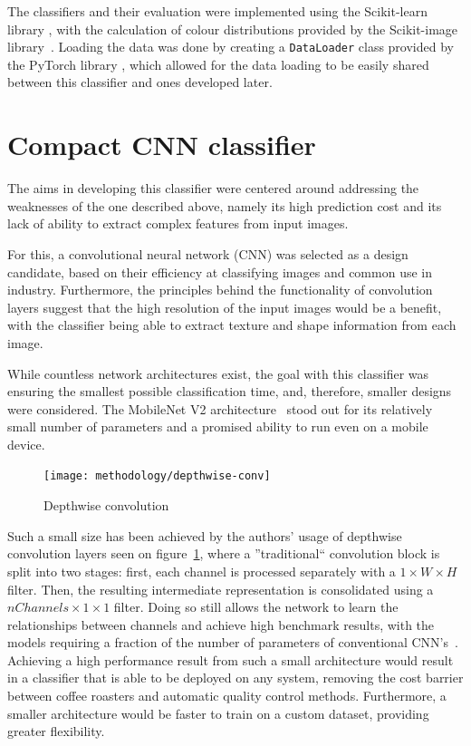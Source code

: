 The classifiers and their evaluation were implemented using the Scikit-learn library \cite{sklearnLibrary}, with the calculation of colour
distributions provided by the Scikit-image library~\cite{skImageLibrary}.
Loading the data was done by creating a \verb|DataLoader| class provided by the PyTorch library \cite{pytorchLibrary}, which allowed
for the data loading to be easily shared between this classifier and ones developed later.
\section{Compact CNN classifier}
\label{sec:deep-learning}
The aims in developing this classifier were centered around addressing the weaknesses of the one described above,
namely its high prediction cost and its lack of ability to extract complex features from input images.

For this, a convolutional neural network (CNN) was selected as a design candidate, based on their
efficiency at classifying images and common use in industry.
Furthermore, the principles behind the functionality of convolution layers suggest that the high resolution of the input
images would be a benefit, with the classifier being able to extract texture and shape information from each image.

While countless network architectures exist, the goal with this classifier was ensuring the smallest possible classification time,
and, therefore, smaller designs were considered.
The MobileNet V2 architecture~\cite{mobileNet} stood out for its relatively small number of parameters and a promised ability to run even on
a mobile device.


\begin{figure}
    \centering
    \texttt{[image: methodology/depthwise-conv]}
    \caption[Depthwise convolution]{Depthwise convolution~\cite{mobileNet}}
    \label{fig:depthwiseConv}
    \vspace{-1em}
\end{figure}

Such a small size has been achieved by the authors' usage of depthwise convolution layers seen on figure~\ref{fig:depthwiseConv},
where a ''traditional`` convolution block is split into two stages: first, each channel is processed separately with a $1 \times W \times H$ filter.
Then, the resulting intermediate representation is consolidated using a $nChannels \times 1 \times 1$ filter.
Doing so still allows the network to learn the relationships between channels and achieve high benchmark results, with the models requiring
a fraction of the number of parameters of conventional CNN's~\cite{mobileNet}.
Achieving a high performance result from such a small architecture would result in a classifier that is able to be deployed
on any system, removing the cost barrier between coffee roasters and automatic quality control methods.
Furthermore, a smaller architecture would be faster to train on a custom dataset, providing greater flexibility.

